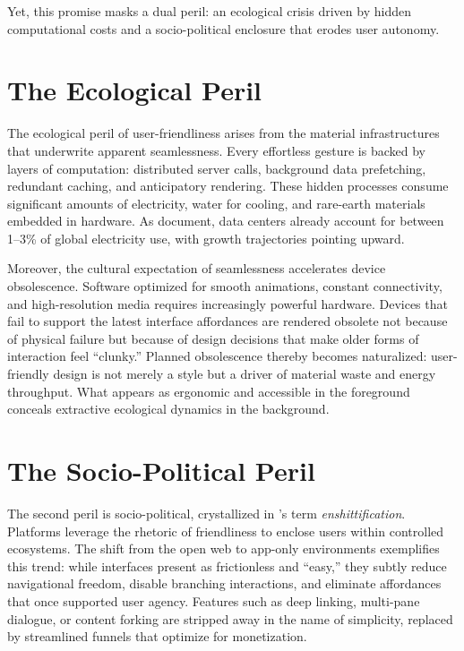 \documentclass[openany]{book}
\begin{document}
Yet, this promise masks a dual peril: an ecological crisis driven by hidden computational costs and a socio-political enclosure that erodes user autonomy.  

\section{The Ecological Peril}
The ecological peril of user-friendliness arises from the material infrastructures that underwrite apparent seamlessness. Every effortless gesture is backed by layers of computation: distributed server calls, background data prefetching, redundant caching, and anticipatory rendering. These hidden processes consume significant amounts of electricity, water for cooling, and rare-earth materials embedded in hardware. As \citet{extentia2024} document, data centers already account for between 1--3\% of global electricity use, with growth trajectories pointing upward.  

Moreover, the cultural expectation of seamlessness accelerates device obsolescence. Software optimized for smooth animations, constant connectivity, and high-resolution media requires increasingly powerful hardware. Devices that fail to support the latest interface affordances are rendered obsolete not because of physical failure but because of design decisions that make older forms of interaction feel “clunky.” Planned obsolescence thereby becomes naturalized: user-friendly design is not merely a style but a driver of material waste and energy throughput. What appears as ergonomic and accessible in the foreground conceals extractive ecological dynamics in the background.

\section{The Socio-Political Peril}
The second peril is socio-political, crystallized in \citet{doctorow2022}’s term \emph{enshittification}. Platforms leverage the rhetoric of friendliness to enclose users within controlled ecosystems. The shift from the open web to app-only environments exemplifies this trend: while interfaces present as frictionless and “easy,” they subtly reduce navigational freedom, disable branching interactions, and eliminate affordances that once supported user agency. Features such as deep linking, multi-pane dialogue, or content forking are stripped away in the name of simplicity, replaced by streamlined funnels that optimize for monetization.  
\end{document}

